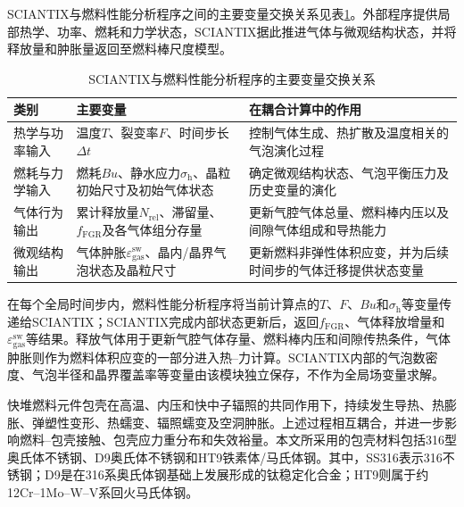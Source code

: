 
SCIANTIX与燃料性能分析程序之间的主要变量交换关系见表\ref{tab:sciantix_coupling_variables}。外部程序提供局部热学、功率、燃耗和力学状态，SCIANTIX据此推进气体与微观结构状态，并将释放量和肿胀量返回至燃料棒尺度模型。

\begin{table}[htbp]
	\centering
	\small
	\renewcommand{\arraystretch}{1.18}
	\caption{SCIANTIX与燃料性能分析程序的主要变量交换关系}
	\label{tab:sciantix_coupling_variables}
	\begin{tabularx}{\textwidth}{p{2.6cm}X X}
		\toprule
		类别 & 主要变量 & 在耦合计算中的作用 \\
		\midrule
		热学与功率输入
		& 温度$T$、裂变率$F$、时间步长$\Delta t$
		& 控制气体生成、热扩散及温度相关的气泡演化过程 \\
		燃耗与力学输入
		& 燃耗$Bu$、静水应力$\sigma_{\mathrm{h}}$、晶粒初始尺寸及初始气体状态
		& 确定微观结构状态、气泡平衡压力及历史变量的演化 \\
		气体行为输出
		& 累计释放量$N_{\mathrm{rel}}$、滞留量、$f_{\mathrm{FGR}}$及各气体组分存量
		& 更新气腔气体总量、燃料棒内压以及间隙气体组成和导热能力 \\
		微观结构输出
		& 气体肿胀$\varepsilon_{\mathrm{gas}}^{\mathrm{sw}}$、晶内/晶界气泡状态及晶粒尺寸
		& 更新燃料非弹性体积应变，并为后续时间步的气体迁移提供状态变量 \\
		\bottomrule
	\end{tabularx}
\end{table}

在每个全局时间步内，燃料性能分析程序将当前计算点的$T$、$F$、$Bu$和$\sigma_{\mathrm{h}}$等变量传递给SCIANTIX；SCIANTIX完成内部状态更新后，返回$f_{\mathrm{FGR}}$、气体释放增量和$\varepsilon_{\mathrm{gas}}^{\mathrm{sw}}$等结果。释放气体用于更新气腔气体存量、燃料棒内压和间隙传热条件，气体肿胀则作为燃料体积应变的一部分进入热--力计算。SCIANTIX内部的气泡数密度、气泡半径和晶界覆盖率等变量由该模块独立保存，不作为全局场变量求解。


\label{sec:cladding_incore_models}

快堆燃料元件包壳在高温、内压和快中子辐照的共同作用下，持续发生导热、热膨胀、弹塑性变形、热蠕变、辐照蠕变及空洞肿胀。上述过程相互耦合，并进一步影响燃料--包壳接触、包壳应力重分布和失效裕量。本文所采用的包壳材料包括316型奥氏体不锈钢、D9奥氏体不锈钢和HT9铁素体/马氏体钢。其中，SS316表示316不锈钢；D9是在316系奥氏体钢基础上发展形成的钛稳定化合金；HT9则属于约12Cr--1Mo--W--V系回火马氏体钢\cite{hofmanMetallicFuelsHandbook2019,halesBISONTheoryManual2016}。

